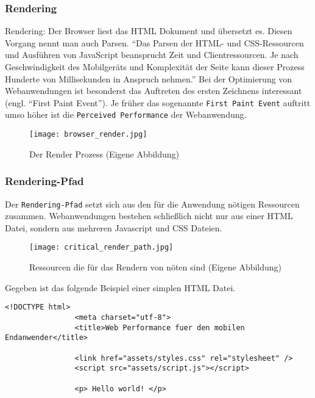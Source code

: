 		\subsubsection{Rendering} %
		\label{ssub:rendering}
			Rendering: Der Browser liest das HTML Dokument und übersetzt es. Diesen Vorgang nennt man auch Parsen. "`Das Parsen der HTML- und CSS-Ressourcen und Ausführen von JavaScript beansprucht Zeit und Clientressourcen. Je nach Geschwindigkeit des Mobilgeräts und Komplexität der Seite kann dieser Prozess Hunderte von Millisekunden in Anspruch nehmen."'\autocite{google14} Bei der Optimierung von Webanwendungen ist besonderst das Auftreten des ersten Zeichnens interessant (engl. "`First Paint Event"'). Je früher das sogenannte \texttt{First Paint Event} auftritt umso höher ist die \texttt{Perceived Performance} der Webanwendung.

			\begin{figure}[htbp]
				\begin{center}
					\texttt{[image: browser\_render.jpg]}
					\caption{Der Render Prozess (Eigene Abbildung)}
					\label{fig:browser_render}
				\end{center}
			\end{figure}


		\subsubsection{Rendering-Pfad} %
		\label{ssub:rendering_pfad}

			Der \texttt{Rendering-Pfad} setzt sich aus den für die Anwendung nötigen Ressourcen zusammen. Webanwendungen bestehen schließlich nicht nur aus einer HTML Datei, sondern aus mehreren Javascript und CSS Dateien.

			\begin{figure}[htbp]
				\begin{center}
					\texttt{[image: critical\_render\_path.jpg]}
					\caption{Ressourcen die für das Rendern von nöten sind (Eigene Abbildung)}
					\label{fig:critical_render_path}
				\end{center}
			\end{figure}

			Gegeben ist das folgende Beispiel einer simplen HTML Datei.

			\begin{lstlisting}[captionpos=b, caption=Beispiel Code, label=beispielCode]
				<!DOCTYPE html>
				<meta charset="utf-8">
				<title>Web Performance fuer den mobilen Endanwender</title>

				<link href="assets/styles.css" rel="stylesheet" />
				<script src="assets/script.js"></script>

				<p> Hello world! </p>

			\end{lstlisting}

